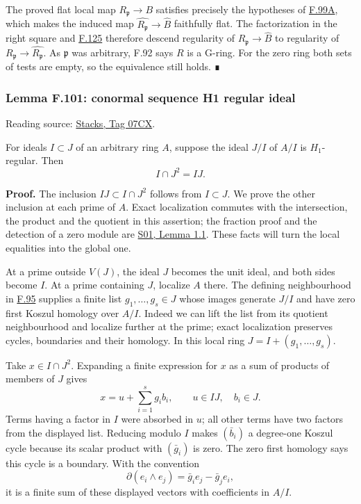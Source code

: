 \documentclass[11pt,a4paper,openany]{report}
\begin{document}
The proved flat local map \(R_{\mathfrak p}\to B\) satisfies precisely the hypotheses of \hyperref[AG-RG-S05-completion-flat-local-map]{F.99A}, which makes the induced map \(\widehat{R_{\mathfrak p}}\to\widehat B\) faithfully flat. The factorization in the right square and \hyperref[AG-RG-S05-more-algebra-lemma-regular-permanence]{F.125} therefore descend regularity of \(R_{\mathfrak p}\to\widehat B\) to regularity of \(R_{\mathfrak p}\to\widehat{R_{\mathfrak p}}\). As \(\mathfrak p\) was arbitrary, F.92 says \(R\) is a G-ring. For the zero ring both sets of tests are empty, so the equivalence still holds. ∎

\label{AG-RG-S05-more-algebra-lemma-conormal-sequence-H1-regular-ideal}

\subsubsection{Lemma F.101: conormal sequence H1 regular ideal}\label{AG-RG-S05-lemma-f.101-conormal-sequence-h1-regular-ideal}

Reading source: \href{https://stacks.math.columbia.edu/tag/07CX}{Stacks, Tag 07CX}.

For ideals \(I\subset J\) of an arbitrary ring \(A\), suppose the ideal \(J/I\) of \(A/I\) is \(H_1\)-regular. Then \[
I\cap J^2=IJ.
\]

\textbf{Proof.} The inclusion \(IJ\subset I\cap J^2\) follows from \(I\subset J\). We prove the other inclusion at each prime of \(A\). Exact localization commutes with the intersection, the product and the quotient in this assertion; the fraction proof and the detection of a zero module are \href{https://github.com/KokunoYumeto/open-math-courses/blob/main/docs/courses/AG-RG/AG-RG-S01.md}{S01, Lemma 1.1}. These facts will turn the local equalities into the global one.

At a prime outside \(V(J)\), the ideal \(J\) becomes the unit ideal, and both sides become \(I\). At a prime containing \(J\), localize \(A\) there. The defining neighbourhood in \hyperref[AG-RG-S05-more-algebra-definition-regular-ideal]{F.95} supplies a finite list \(g_1,\ldots,g_s\in J\) whose images generate \(J/I\) and have zero first Koszul homology over \(A/I\). Indeed we can lift the list from its quotient neighbourhood and localize further at the prime; exact localization preserves cycles, boundaries and their homology. In this local ring \(J=I+(g_1,\ldots,g_s)\).

Take \(x\in I\cap J^2\). Expanding a finite expression for \(x\) as a sum of products of members of \(J\) gives \[
x=u+\sum_{i=1}^s g_i b_i,
\qquad u\in IJ,\quad b_i\in J.
\] Terms having a factor in \(I\) were absorbed in \(u\); all other terms have two factors from the displayed list. Reducing modulo \(I\) makes \((\bar b_i)\) a degree-one Koszul cycle because its scalar product with \((\bar g_i)\) is zero. The zero first homology says this cycle is a boundary. With the convention \[
\partial(e_i\wedge e_j)=\bar g_i e_j-\bar g_j e_i,
\] it is a finite sum of these displayed vectors with coefficients in \(A/I\).
\end{document}

